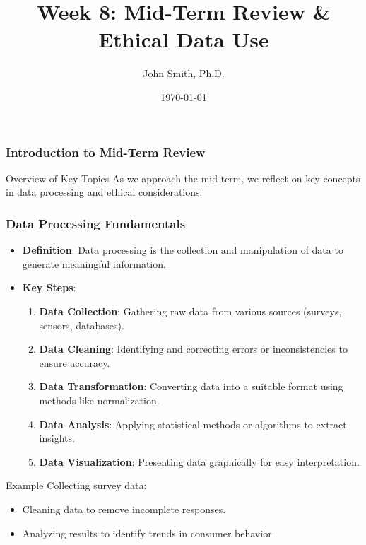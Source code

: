 \documentclass[aspectratio=169]{beamer}
\title[Chapter: Mid-Term Review]{Week 8: Mid-Term Review \& Ethical Data Use}
\author[J. Smith]{John Smith, Ph.D.}
\institute[University Name]{
  Department of Computer Science\\
  University Name\\
  \vspace{0.3cm}
  Email: email@university.edu\\
  Website: www.university.edu
}
\date{\today}
\begin{document}
\frame{\titlepage}

\begin{frame}[fragile]
    \frametitle{Introduction to Mid-Term Review}
    \begin{block}{Overview of Key Topics}
        As we approach the mid-term, we reflect on key concepts in data processing and ethical considerations:
    \end{block}
\end{frame}

\begin{frame}[fragile]
    \frametitle{Data Processing Fundamentals}
    \begin{itemize}
        \item \textbf{Definition}: Data processing is the collection and manipulation of data to generate meaningful information.
        \item \textbf{Key Steps}:
        \begin{enumerate}
            \item \textbf{Data Collection}: Gathering raw data from various sources (surveys, sensors, databases).
            \item \textbf{Data Cleaning}: Identifying and correcting errors or inconsistencies to ensure accuracy.
            \item \textbf{Data Transformation}: Converting data into a suitable format using methods like normalization.
            \item \textbf{Data Analysis}: Applying statistical methods or algorithms to extract insights.
            \item \textbf{Data Visualization}: Presenting data graphically for easy interpretation.
        \end{enumerate}
    \end{itemize}
    \begin{block}{Example}
        Collecting survey data:
        \begin{itemize}
            \item Cleaning data to remove incomplete responses.
            \item Analyzing results to identify trends in consumer behavior.
        \end{itemize}
    \end{block}
\end{frame}
\end{document}
